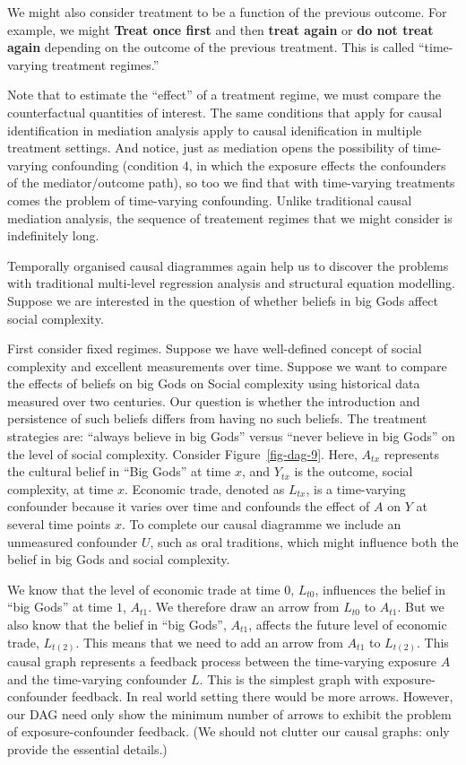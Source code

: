 \documentclass[
  singlecolumn]{report}
\begin{document}
We might also consider treatment to be a function of the previous
outcome. For example, we might \textbf{Treat once first} and then
\textbf{treat again} or \textbf{do not treat again} depending on the
outcome of the previous treatment. This is called ``time-varying
treatment regimes.''

Note that to estimate the ``effect'' of a treatment regime, we must
compare the counterfactual quantities of interest. The same conditions
that apply for causal identification in mediation analysis apply to
causal idenification in multiple treatment settings. And notice, just as
mediation opens the possibility of time-varying confounding (condition
4, in which the exposure effects the confounders of the mediator/outcome
path), so too we find that with time-varying treatments comes the
problem of time-varying confounding. Unlike traditional causal mediation
analysis, the sequence of treatement regimes that we might consider is
indefinitely long.

Temporally organised causal diagrammes again help us to discover the
problems with traditional multi-level regression analysis and structural
equation modelling. Suppose we are interested in the question of whether
beliefs in big Gods affect social complexity.

First consider fixed regimes. Suppose we have well-defined concept of
social complexity and excellent measurements over time. Suppose we want
to compare the effects of beliefs on big Gods on Social complexity using
historical data measured over two centuries. Our question is whether the
introduction and persistence of such beliefs differs from having no such
beliefs. The treatment strategies are: ``always believe in big Gods''
versus ``never believe in big Gods'' on the level of social complexity.
Consider Figure~\ref{fig-dag-9}. Here, \(A_{tx}\) represents the
cultural belief in ``Big Gods'' at time \(x\), and \(Y_{tx}\) is the
outcome, social complexity, at time \(x\). Economic trade, denoted as
\(L_{tx}\), is a time-varying confounder because it varies over time and
confounds the effect of \(A\) on \(Y\) at several time points \(x\). To
complete our causal diagramme we include an unmeasured confounder \(U\),
such as oral traditions, which might influence both the belief in big
Gods and social complexity.

We know that the level of economic trade at time \(0\), \(L_{t0}\),
influences the belief in ``big Gods'' at time \(1\), \(A_{t1}\). We
therefore draw an arrow from \(L_{t0}\) to \(A_{t1}\). But we also know
that the belief in ``big Gods'', \(A_{t1}\), affects the future level of
economic trade, \(L_{t(2)}\). This means that we need to add an arrow
from \(A_{t1}\) to \(L_{t(2)}\). This causal graph represents a feedback
process between the time-varying exposure \(A\) and the time-varying
confounder \(L\). This is the simplest graph with exposure-confounder
feedback. In real world setting there would be more arrows. However, our
DAG need only show the minimum number of arrows to exhibit the problem
of exposure-confounder feedback. (We should not clutter our causal
graphs: only provide the essential details.)
\end{document}

